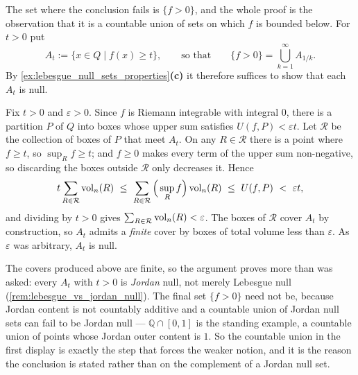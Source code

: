 \begin{exercisesolution}
\label{sol:vanishing_integral_forces_zero_ae}
The set where the conclusion fails is $\{f > 0\}$, and the whole proof is the observation that it
is a countable union of sets on which $f$ is bounded below. For $t > 0$ put
\[A_t := \{x \in Q \mid f(x) \geq t\}, \qquad\text{so that}\qquad
  \{f > 0\} = \bigcup_{k=1}^\infty A_{1/k}.\]
By \cref{ex:lebesgue_null_sets_properties}\textbf{(c)} it therefore suffices to show that each
$A_t$ is null.

Fix $t > 0$ and $\varepsilon > 0$. Since $f$ is Riemann integrable with integral $0$, there is a
partition $P$ of $Q$ into boxes whose upper sum satisfies $U(f,P) < \varepsilon t$. Let
$\mathcal{R}$ be the collection of boxes of $P$ that meet $A_t$. On any $R \in \mathcal{R}$ there
is a point where $f \geq t$, so $\sup_R f \geq t$; and $f \geq 0$ makes every term of the upper
sum non-negative, so discarding the boxes outside $\mathcal{R}$ only decreases it. Hence
\[t\sum_{R \in \mathcal{R}} \operatorname{vol}_n(R)
  \ \leq\ \sum_{R \in \mathcal{R}} \Big(\sup_R f\Big)\operatorname{vol}_n(R)
  \ \leq\ U(f,P) \ <\ \varepsilon t ,\]
and dividing by $t > 0$ gives $\sum_{R\in\mathcal{R}}\operatorname{vol}_n(R) < \varepsilon$. The boxes of
$\mathcal{R}$ cover $A_t$ by construction, so $A_t$ admits a \emph{finite} cover by boxes of
total volume less than $\varepsilon$. As $\varepsilon$ was arbitrary, $A_t$ is null.

\begin{remark}
The covers produced above are finite, so the argument proves more than was asked: every
$A_t$ with $t>0$ is \emph{Jordan} null, not merely Lebesgue null
(\cref{rem:lebesgue_vs_jordan_null}). The final set $\{f > 0\}$ need not be, because Jordan
content is not countably additive and a countable union of Jordan null sets can fail to be Jordan
null --- $\mathbb{Q}\cap[0,1]$ is the standing example, a countable union of points whose Jordan
outer content is $1$. So the countable union in the first display is exactly the step that forces
the weaker notion, and it is the reason the conclusion is stated  rather
than on the complement of a Jordan null set.


\end{remark}
\end{exercisesolution}
